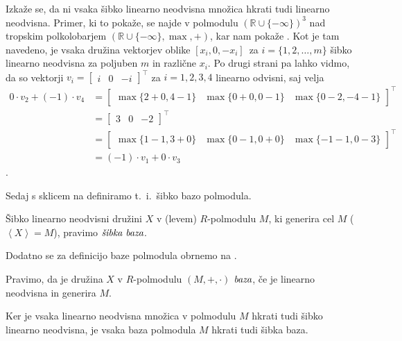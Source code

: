 \documentclass[mat1]{fmfdelo}
\newcommand{\R}{\mathbb{R}}
\newcommand{\pojem}[1]{\ensuremath{\emph{#1}}}
\newcommand{\Gen}[1]{\ensuremath{\left<{#1}\right>}}
\begin{document}
Izkaže se, da ni vsaka šibko linearno neodvisna množica hkrati tudi linearno neodvisna. Primer, ki to pokaže, se najde v polmodulu $(\R\cup\{-\infty\})^3$ nad tropskim polkolobarjem $(\R\cup\{-\infty\}, \max, +)$, kar nam pokaže \cite[zgled 2.\ 14.]{bib:AkianTropSemi}. Kot je tam navedeno, je vsaka družina vektorjev oblike $[x_i, 0, -x_i]$~za $i = \{1, 2, \ldots, m\}$ šibko linearno neodvisna za poljuben $m$ in različne $x_i$. Po drugi strani pa lahko vidmo, da so vektorji $v_i = \begin{bmatrix}i & 0 & -i\end{bmatrix}^\top$ za $i = 1, 2, 3, 4$ linearno odvisni, saj velja \begin{align*}0\cdot v_2 + (-1)\cdot v_4 &= \begin{bmatrix}\max\{2+0,4-1\} &\max\{0+0,0-1\}&\max\{0-2, -4-1\} \end{bmatrix}^\top \\ &= \begin{bmatrix}3 & 0 & -2\end{bmatrix}^\top\\ &= \begin{bmatrix}\max\{1-1, 3+0\}&\max\{0-1, 0+0\}&\max\{-1-1, 0-3\}\end{bmatrix}^\top \\ &= (-1)\cdot v_1 + 0\cdot v_3\end{align*}.

Sedaj s sklicem na \cite[Definicija 2.~4.]{bib:Tanbase} definiramo t.~i.~šibko bazo polmodula.

\begin{definicija}\label{def:polmodbaza}
	Šibko linearno neodvisni družini $X$ v (levem) $R$-polmodulu $M$, ki generira cel $M$ ($\Gen{X} = M$), pravimo \pojem{šibka baza}.
\end{definicija}

Dodatno se za definicijo baze polmodula obrnemo na \cite[poglavje 5, definicija 2.\ 5.\ 2.]{bib:Gondran}.

\begin{definicija}
	Pravimo, da je družina $X$ v $R$-polmodulu $(M, +, \cdot)$ \pojem{baza}, če je linearno neodvisna in generira $M$.
\end{definicija}

\begin{opomba}
Ker je vsaka linearno neodvisna množica v polmodulu $M$ hkrati tudi šibko linearno neodvisna, je vsaka baza polmodula $M$ hkrati tudi šibka baza.
\end{opomba}
\end{document}
